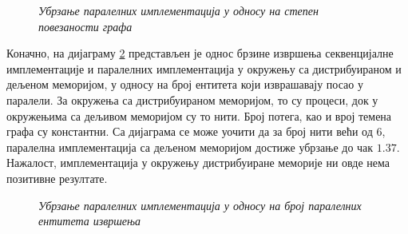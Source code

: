 \begin{figure}[H]
    \centering
    \caption{\textit{Убрзање паралелних имплементација у односу на степен повезаности графа}}
    \label{diagram:bfs-speedup-edge-numb-variable}
\end{figure}

Коначно, на дијаграму \ref{diagram:bfs-speedup-par-entity-numb-variable} представљен је однос брзине извршења секвенцијалне имплементације и паралелних имплементација у окружењу са дистрибуираном и дељеном меморијом, у односу на број ентитета који изврашавају посао у паралели. За окружења са дистрибуираном меморијом, то су процеси, док у окружењима са дељивом меморијом су то нити. Број потега, као и врој темена графа су константни. Са дијаграма се може уочити да за број нити већи од $6$, паралелна имплементација са дељеном меморијом достиже убрзање до чак $1.37$. Нажалост, имплементација у окружењу дистрибуиране меморије ни овде нема позитивне резултате.

\begin{figure}[H]
    \centering
    \caption{\textit{Убрзање паралелних имплементација у односу на број паралелних ентитета извршења}}
    \label{diagram:bfs-speedup-par-entity-numb-variable}
\end{figure}

